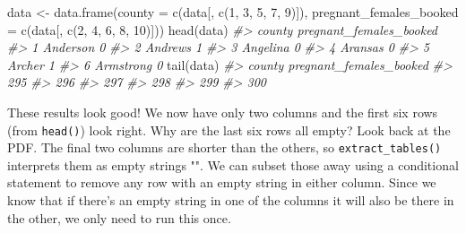 \documentclass[
]{krantz}
\makeatletter
\newenvironment{Shaded}{\begin{snugshade}}{\end{snugshade}}
\newcommand{\AttributeTok}[1]{\textcolor[rgb]{0.61,0.61,0.61}{#1}}
\newcommand{\CommentTok}[1]{\textcolor[rgb]{0.37,0.37,0.37}{\textit{#1}}}
\newcommand{\DecValTok}[1]{\textcolor[rgb]{0.06,0.06,0.06}{#1}}
\newcommand{\FunctionTok}[1]{\textcolor[rgb]{0,0,0}{#1}}
\newcommand{\NormalTok}[1]{#1}
\newcommand{\OtherTok}[1]{\textcolor[rgb]{0.37,0.37,0.37}{#1}}
\newenvironment{kframe}{%
\medskip{}
\setlength{\fboxsep}{.8em}
 \def\at@end@of@kframe{}%
 \ifinner\ifhmode%
  \def\at@end@of@kframe{\end{minipage}}%
  \begin{minipage}{\columnwidth}%
 \fi\fi%
 \def\FrameCommand##1{\hskip\@totalleftmargin \hskip-\fboxsep
 \colorbox{shadecolor}{##1}\hskip-\fboxsep
     \hskip-\linewidth \hskip-\@totalleftmargin \hskip\columnwidth}%
 \MakeFramed {\advance\hsize-\width
   \@totalleftmargin\z@ \linewidth\hsize
   \@setminipage}}%
 {\par\unskip\endMakeFramed%
 \at@end@of@kframe}
\renewenvironment{Shaded}{\begin{kframe}}{\end{kframe}}
\makeatother
\begin{document}
\begin{Shaded}
\begin{Highlighting}[]
\NormalTok{data }\OtherTok{\textless{}{-}} \FunctionTok{data.frame}\NormalTok{(}\AttributeTok{county =} \FunctionTok{c}\NormalTok{(data[, }\FunctionTok{c}\NormalTok{(}\DecValTok{1}\NormalTok{, }\DecValTok{3}\NormalTok{, }\DecValTok{5}\NormalTok{, }\DecValTok{7}\NormalTok{, }\DecValTok{9}\NormalTok{)]),}
              \AttributeTok{pregnant\_females\_booked =} \FunctionTok{c}\NormalTok{(data[, }\FunctionTok{c}\NormalTok{(}\DecValTok{2}\NormalTok{, }\DecValTok{4}\NormalTok{, }\DecValTok{6}\NormalTok{, }\DecValTok{8}\NormalTok{, }\DecValTok{10}\NormalTok{)]))}
\FunctionTok{head}\NormalTok{(data)}
\CommentTok{\#\textgreater{}      county pregnant\_females\_booked}
\CommentTok{\#\textgreater{} 1  Anderson                       0}
\CommentTok{\#\textgreater{} 2   Andrews                       1}
\CommentTok{\#\textgreater{} 3  Angelina                       0}
\CommentTok{\#\textgreater{} 4   Aransas                       0}
\CommentTok{\#\textgreater{} 5    Archer                       1}
\CommentTok{\#\textgreater{} 6 Armstrong                       0}
\FunctionTok{tail}\NormalTok{(data)}
\CommentTok{\#\textgreater{}     county pregnant\_females\_booked}
\CommentTok{\#\textgreater{} 295                               }
\CommentTok{\#\textgreater{} 296                               }
\CommentTok{\#\textgreater{} 297                               }
\CommentTok{\#\textgreater{} 298                               }
\CommentTok{\#\textgreater{} 299                               }
\CommentTok{\#\textgreater{} 300}
\end{Highlighting}
\end{Shaded}

These results look good! We now have only two columns and the first six rows (from \texttt{head()}) look right. Why are the last six rows all empty? Look back at the PDF. The final two columns are shorter than the others, so \texttt{extract\_tables()} interprets them as empty strings "". We can subset those away using a conditional statement to remove any row with an empty string in either column. Since we know that if there's an empty string in one of the columns it will also be there in the other, we only need to run this once.
\end{document}
